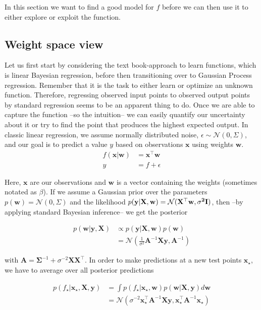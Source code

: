 \documentclass[authoryear,11pt,review]{elsarticle}
\begin{document}
In this section we want to find a good model for $f$ before we can then use it to either explore or exploit the function.


\subsection{Weight space view}
Let us first start by considering the text book-approach to learn functions, which is linear Bayesian regression, before then transitioning over to Gaussian Process regression. Remember that it is the task to either learn or optimize an unknown function. Therefore, regressing observed input points to observed output points by standard regression seems to be an apparent thing to do. Once we are able to capture the function --so the intuition-- we can easily quantify our uncertainty about it or try to find the point that produces the highest expected output.
In classic linear regression, we assume normally distributed noise, $\epsilon\sim\mathcal{N}(0, \Sigma)$, and our goal is to predict a value $y$ based on observations $\mathbf{x}$ using weights $\mathbf{w}$.\\

\begin{align*}
f(\mathbf{x}|\mathbf{w})&=\mathbf{x}^\top\mathbf{w}\\
y&=f+\epsilon
\end{align*}

Here, $\mathbf{x}$ are our observations and $\mathbf{w}$ is a vector containing the weights (sometimes notated as $\beta$). If we assume a Gaussian prior over the parameters $p(\mathbf{w})=\mathcal{N}(0, \Sigma)$ and the likelihood $p(\mathbf{y}|\bf{X,w})=\mathcal{N}(\mathbf{X}^\top \mathbf{w},\sigma^2\mathbf{I})$, then --by applying standard Bayesian inference-- we get the posterior

\begin{align*}
p(\mathbf{w}|\mathbf{y,X}) & \propto p(\mathbf{y}|\mathbf{X,w})p(\mathbf{w})\\
&=\mathcal{N}(\frac{1}{\sigma^2}\mathbf{A}^{-1}\mathbf{Xy}, \mathbf{A}^{-1})
\end{align*}

with $\mathbf{A}=\mathbf{\Sigma}^{-1}+\sigma^{-2}\mathbf{XX}^{\top}$. In order to make predictions at a new test points $\mathbf{x}_\star$, we have to average over all posterior predictions

\begin{align*}
p(f_\star|\mathbf{x}_\star, \mathbf{X},\mathbf{y})&=\int p(f_\star|\mathbf{x}_\star,\mathbf{w})p(\mathbf{w}|\mathbf{X},\mathbf{y})d\mathbf{w}\\
&=\mathcal{N}(\sigma^{-2}\mathbf{x}_\star^{\top} \mathbf{A}^{-1} \mathbf{Xy},\mathbf{x}_\star^{\top} \mathbf{A}^{-1}\mathbf{x}_\star)
\end{align*}
\end{document}
